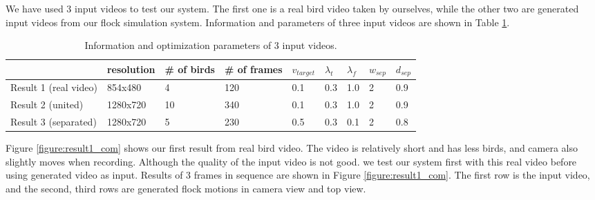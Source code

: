 We have used 3 input videos to test our system. The first one is a real bird video taken by ourselves, while the other two are generated input videos from our flock simulation system.  Information and parameters of three input videos are shown in Table \ref{table:result}.


\begin{table}[h]
\begin{tabular}{|l|l|l|l|l|l|l|l|l|}
\hline
  & resolution & \# of birds & \# of frames & $v_{target}$ & $\lambda_{t}$ & $\lambda_{f}$ & $w_{sep}$ & $d_{sep}$ \\ \hline
Result 1 (real video) & 854x480    & 4           & 120          & 0.1          & 0.3           & 1.0           & 2         & 0.9       \\ \hline
Result 2 (united)     & 1280x720   & 10          & 340          & 0.1          & 0.3           & 1.0          & 2         & 0.9         \\ \hline
Result 3 (separated)  & 1280x720   & 5           & 230          & 0.5          & 0.3           & 0.1           & 2         & 0.8       \\ \hline
\end{tabular}
\caption{Information and optimization parameters of 3 input videos.}
\label{table:result}
\end{table}




Figure \ref{figure:result1_com} shows our first result from real bird video. The video is relatively short and has less birds, and camera also  slightly moves when recording. Although the quality of the input video is not good. we test our system first with this real video before using generated video as input. Results of 3 frames in sequence are shown in Figure \ref{figure:result1_com}. The first row is the input video, and the second, third rows are generated flock motions in camera view and top view.



